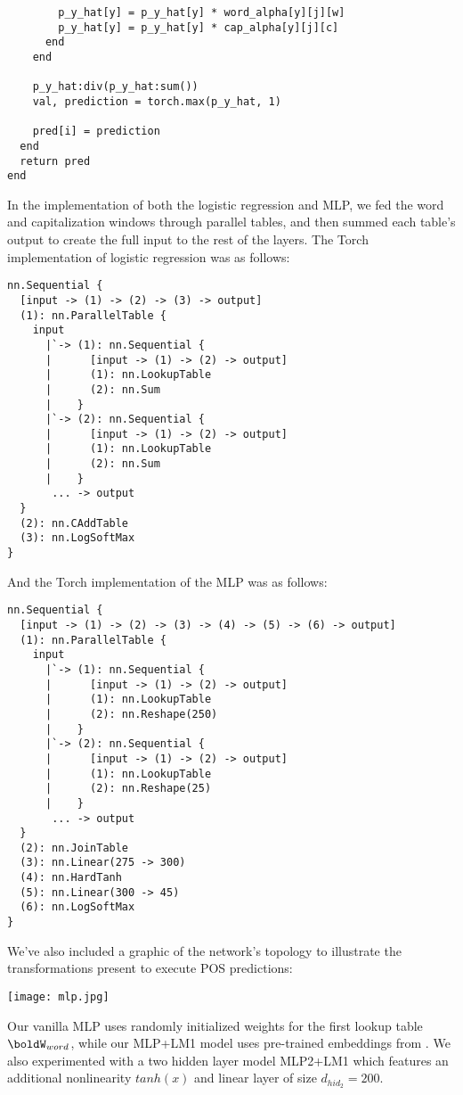 \documentclass[11pt]{article}
\begin{document}
{{\begin{verbatim}
        p_y_hat[y] = p_y_hat[y] * word_alpha[y][j][w]
        p_y_hat[y] = p_y_hat[y] * cap_alpha[y][j][c]
      end
    end

    p_y_hat:div(p_y_hat:sum())
    val, prediction = torch.max(p_y_hat, 1)

    pred[i] = prediction
  end
  return pred
end
\end{verbatim}

In the implementation of both the logistic regression and MLP, we fed the word and capitalization windows through parallel tables, and then summed each table's output to create the full input to the rest of the layers. The Torch implementation of logistic regression was as follows:
\begin{verbatim}
nn.Sequential {
  [input -> (1) -> (2) -> (3) -> output]
  (1): nn.ParallelTable {
    input
      |`-> (1): nn.Sequential {
      |      [input -> (1) -> (2) -> output]
      |      (1): nn.LookupTable
      |      (2): nn.Sum
      |    }
      |`-> (2): nn.Sequential {
      |      [input -> (1) -> (2) -> output]
      |      (1): nn.LookupTable
      |      (2): nn.Sum
      |    }
       ... -> output
  }
  (2): nn.CAddTable
  (3): nn.LogSoftMax
}
\end{verbatim}

And the Torch implementation of the MLP was as follows:
\begin{verbatim}
nn.Sequential {
  [input -> (1) -> (2) -> (3) -> (4) -> (5) -> (6) -> output]
  (1): nn.ParallelTable {
    input
      |`-> (1): nn.Sequential {
      |      [input -> (1) -> (2) -> output]
      |      (1): nn.LookupTable
      |      (2): nn.Reshape(250)
      |    }
      |`-> (2): nn.Sequential {
      |      [input -> (1) -> (2) -> output]
      |      (1): nn.LookupTable
      |      (2): nn.Reshape(25)
      |    }
       ... -> output
  }
  (2): nn.JoinTable
  (3): nn.Linear(275 -> 300)
  (4): nn.HardTanh
  (5): nn.Linear(300 -> 45)
  (6): nn.LogSoftMax
}
\end{verbatim}

We've also included a graphic of the network's topology to illustrate the transformations present to execute POS predictions:
\begin{center}
    \texttt{[image: mlp.jpg]}
\end{center}

Our vanilla MLP uses randomly initialized weights for the first lookup table $\boldW_{word}$, while our MLP+LM1 model uses pre-trained embeddings from \cite{pennington2014glove}. We also experimented with a two hidden layer model MLP2+LM1 which features an additional nonlinearity $tanh(x)$ and linear layer of size $d_{hid_2} = 200$.

}}
\end{document}
